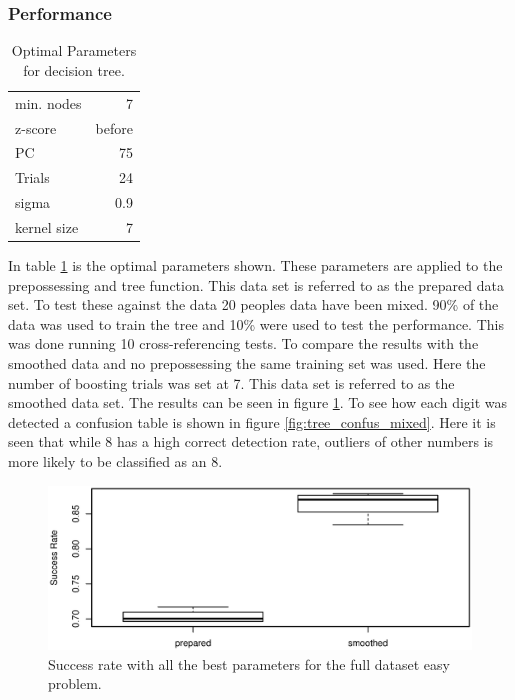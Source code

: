 \subsubsection{Performance}

\begin{table}[h]
\centering
\begin{tabular}{lr}
min. nodes  & 7      \\
z-score     & before \\
PC          & 75     \\
Trials      & 24     \\
sigma       & 0.9    \\
kernel size & 7      \\
\end{tabular}
\caption{Optimal Parameters for decision tree.}
\label{tb:tree_simply_the_best_parameters}
\end{table}


In table \ref{tb:tree_simply_the_best_parameters} is the optimal parameters shown.
These parameters are applied to the prepossessing and tree function. 
This data set is referred to as the prepared data set.
To test these against the data 20 peoples data have been mixed.
90\% of the data was used to train the tree and 10\% were used to test the performance.
This was done running 10 cross-referencing tests. 
To compare the results with the smoothed data and no prepossessing the same training set was used.
Here the number of boosting trials was set at 7. 
This data set is referred to as the smoothed data set.
The results can be seen in figure \ref{fig:tree_performance_mixed}.
To see how each digit was detected a confusion table is shown in figure \ref{fig:tree_confus_mixed}. 
Here it is seen that while 8 has a high correct detection rate, outliers of other numbers is more likely to be classified as an 8.

\begin{figure}[H]
\centering
\includegraphics[width=\textwidth]{graphics/tree_performance_mix_combined}
\caption{Success rate with all the best parameters for the full dataset easy problem.}
\label{fig:tree_performance_mixed}
\end{figure}

